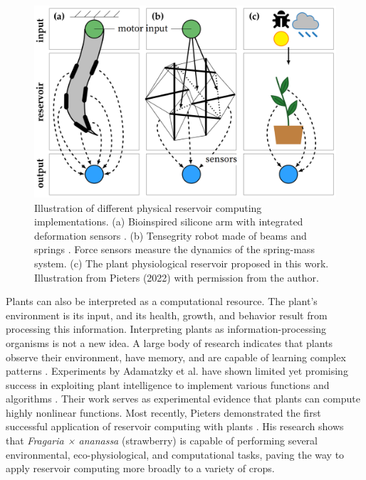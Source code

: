 \documentclass[10pt,a4paper,journal]{IEEEtran}
\begin{document}
\begin{figure}[t]
	\centering
    \includegraphics[width=\linewidth]{imgs/prc-illustration-small.png}
	\caption{\small Illustration of different physical reservoir computing implementations.
	            (a) Bioinspired silicone arm with integrated deformation sensors \cite{nakajima_information_2015}.
	            (b) Tensegrity robot made of beams and springs \cite{caluwaerts_locomotion_2013}. Force sensors measure the dynamics of the spring-mass system.
	            (c) The plant physiological reservoir proposed in this work.
    	 	Illustration from Pieters (2022)\supercite{pieters_reservoir_2022} with permission from the author.}
	\label{fig:prc_examples}
\end{figure}


Plants can also be interpreted as a computational resource.
The plant's environment is its input, and its health, growth, and behavior result from processing this information.
Interpreting plants as information-processing organisms is not a new idea.
A large body of research indicates that plants observe their environment, have memory, and are capable of learning complex patterns \cite{mancuso_revolutionary_2018}. 
Experiments by Adamatzky et al. have shown limited yet promising success in exploiting plant intelligence to implement various functions and algorithms \cite{stepney_computers_2018}.
Their work serves as experimental evidence that plants can compute highly nonlinear functions.
Most recently, Pieters demonstrated the first successful application of reservoir computing with plants \cite{pieters_reservoir_2022}. 
His research shows that \textit{Fragaria × ananassa} (strawberry) is capable of performing several environmental, eco-physiological, and computational tasks, paving the way to apply reservoir computing more broadly to a variety of crops.
\end{document}
